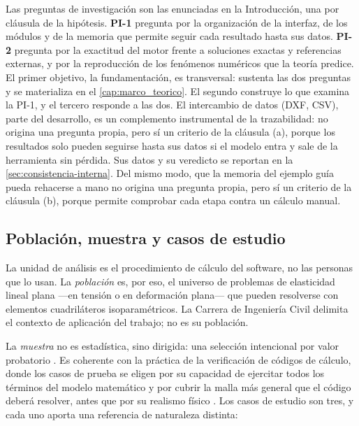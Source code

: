 Las preguntas de investigación son las enunciadas en la Introducción, una por cláusula de la hipótesis. \textbf{PI-1} pregunta por la organización de la interfaz, de los módulos y de la memoria que permite seguir cada resultado hasta sus datos. \textbf{PI-2} pregunta por la exactitud del motor frente a soluciones exactas y referencias externas, y por la reproducción de los fenómenos numéricos que la teoría predice. El primer objetivo, la fundamentación, es transversal: sustenta las dos preguntas y se materializa en el \autoref{cap:marco_teorico}. El segundo construye lo que examina la PI-1, y el tercero responde a las dos. El intercambio de datos (DXF, CSV), parte del desarrollo, es un complemento instrumental de la trazabilidad: no origina una pregunta propia, pero sí un criterio de la cláusula (a), porque los resultados solo pueden seguirse hasta sus datos si el modelo entra y sale de la herramienta sin pérdida. Sus datos y su veredicto se reportan en la \autoref{sec:consistencia-interna}. Del mismo modo, que la memoria del ejemplo guía pueda rehacerse a mano no origina una pregunta propia, pero sí un criterio de la cláusula (b), porque permite comprobar cada etapa contra un cálculo manual.

\subsection{Población, muestra y casos de estudio}
\label{sec:poblacion}

La unidad de análisis es el procedimiento de cálculo del software, no las personas que lo usan. La \emph{población} es, por eso, el universo de problemas de elasticidad lineal plana —en tensión o en deformación plana— que pueden resolverse con elementos cuadriláteros isoparamétricos. La Carrera de Ingeniería Civil delimita el contexto de aplicación del trabajo; no es su población.

La \emph{muestra} no es estadística, sino dirigida: una selección intencional por valor probatorio \autocite[p.~215]{sampieri2018metodologia}. Es coherente con la práctica de la verificación de códigos de cálculo, donde los casos de prueba se eligen por su capacidad de ejercitar todos los términos del modelo matemático y por cubrir la malla más general que el código deberá resolver, antes que por su realismo físico \autocite[pp.~190, 208]{oberkampf2010vv}. Los casos de estudio son tres, y cada uno aporta una referencia de naturaleza distinta:

